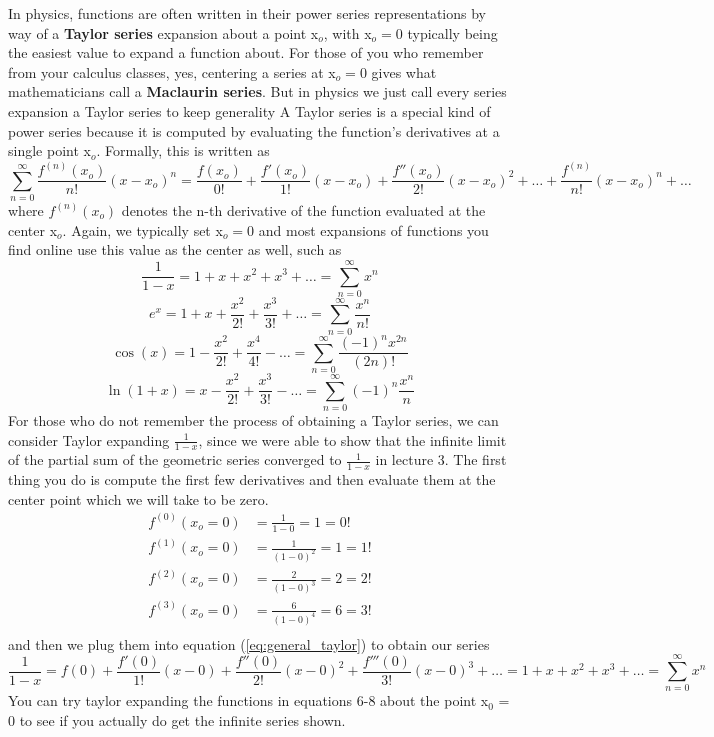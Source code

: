 \documentclass{article}
\newcommand{\be}{\begin{equation}}
\newcommand{\ee}{\end{equation}}
\newcommand{\sumzero}{\sum_{n=0}^\infty}
\begin{document}
In physics, functions are often written in their power series representations by way of a \textbf{Taylor series} expansion about a point x$_o$, with x$_o = 0$ typically being the easiest value to expand a function about.
For those of you who remember from your calculus classes, yes, centering a series at x$_o = 0$ gives what mathematicians call a \textbf{Maclaurin series}.
But in physics we just call every series expansion a Taylor series to keep generality
A Taylor series is a special kind of power series because it is computed by evaluating the function's derivatives at a single point x$_o$.
Formally, this is written as
\be \label{eq:general_taylor}
\sumzero \frac{f^{(n)} (x_o)} {n!} (x - x_o)^n = \frac{f(x_o)}{0!} + \frac{f'(x_o)}{1!} (x - x_o) + \frac{f''(x_o)}{2!} (x - x_o)^2 + \hdots + \frac{ f^{(n)} }{n!}(x - x_o)^n + \hdots
\ee
where $f^{(n)} (x_o)$ denotes the n-th derivative of the function evaluated at the center x$_o$.
Again, we typically set x$_o = 0$ and most expansions of functions you find online use this value as the center as well, such as
\be
\frac{1}{1-x} = 1 + x + x^2 + x^3 + \hdots = \sumzero x^n
\ee
\be
e^x = 1 + x + \frac{x^2}{2!} + \frac{x^3}{3!} + \hdots = \sumzero \frac{x^n}{n!}
\ee
\be
\cos(x) = 1 - \frac{x^2}{2!} + \frac{x^4}{4!} - \hdots = \sumzero \frac{(-1)^n x^{2n}}{(2n)!}
\ee
\be
\ln(1+x) = x - \frac{x^2}{2!} + \frac{x^3}{3!} - \hdots = \sumzero (-1)^{n} \frac{x^n}{n}
\ee
For those who do not remember the process of obtaining a Taylor series, we can consider Taylor expanding $\frac{1}{1 - x}$, since we were able to show that the infinite limit of the partial sum of the geometric series converged to $\frac{1}{1-x}$ in lecture 3.
The first thing you do is compute the first few derivatives and then evaluate them at the center point which we will take to be zero.
\be
\begin{split}
f^{(0)} (x_o = 0) &= \frac{1}{1-0} = 1 = 0!\\
f^{(1)} (x_o = 0) &= \frac{1}{(1-0)^2} = 1 = 1!\\
f^{(2)} (x_o = 0) &= \frac{2}{(1-0)^3} = 2 = 2!\\
f^{(3)} (x_o = 0) &= \frac{6}{(1-0)^4} = 6 = 3!\\
\end{split}
\ee
and then we plug them into equation (\ref{eq:general_taylor}) to obtain our series
\be
\frac{1}{1-x} = f(0) + \frac{f'(0)}{1!} (x - 0) + \frac{f''(0)}{2!} (x - 0)^2 + \frac{f'''(0)}{3!} (x - 0)^3 + \hdots = 1 + x + x^2 + x^3 + \hdots = \sumzero x^n
\ee
You can try taylor expanding the functions in equations 6-8 about the point x$_0$ = 0 to see if you actually do get the infinite series shown.
\end{document}
